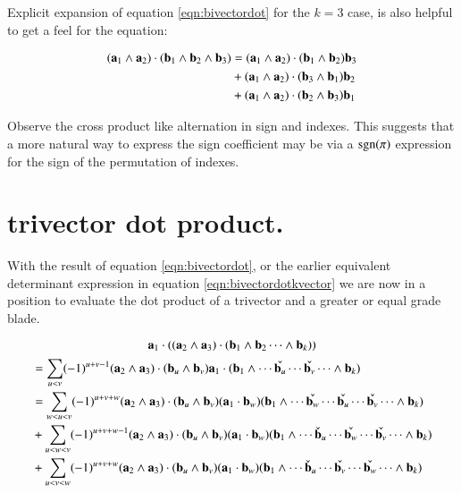 \documentclass{article}      %
\begin{document}
Explicit expansion of equation \ref{eqn:bivectordot} for the $k=3$ case, is also helpful to get a feel for
the equation:

\begin{align*}
(\mathbf{a}_{1} \wedge \mathbf{a}_2) \cdot (\mathbf{b}_1 \wedge \mathbf{b}_2 \wedge \mathbf{b}_3)
&= 
(\mathbf{a}_1 \wedge \mathbf{a}_2) \cdot (\mathbf{b}_1 \wedge \mathbf{b}_2) \mathbf{b}_3 \\
&+(\mathbf{a}_1 \wedge \mathbf{a}_2) \cdot (\mathbf{b}_3 \wedge \mathbf{b}_1) \mathbf{b}_2 \\
&+(\mathbf{a}_1 \wedge \mathbf{a}_2) \cdot (\mathbf{b}_2 \wedge \mathbf{b}_3) \mathbf{b}_1
\end{align*}

Observe the cross product like alternation in sign and indexes.
This suggests that a more natural way to express the sign coefficient may be via a $\operatorname{sgn}(\pi)$ expression for the sign of the
permutation of indexes.

\section{ trivector dot product. }

With the result of equation \ref{eqn:bivectordot}, or the earlier equivalent determinant expression in equation 
\ref{eqn:bivectordotkvector} we are now in a position to evaluate the dot product of a trivector and a greater or equal grade blade.

\begin{equation*}
\mathbf{a}_1 \cdot ((\mathbf{a}_{2} \wedge \mathbf{a}_3) \cdot (\mathbf{b}_1 \wedge \mathbf{b}_2 \cdots \wedge \mathbf{b}_k))
\end{equation*}
\begin{align*}
&= 
\sum_{u<v} (-1)^{u+v-1} 
(\mathbf{a}_2 \wedge \mathbf{a}_3) \cdot (\mathbf{b}_u \wedge \mathbf{b}_v)
\mathbf{a}_1 \cdot (\mathbf{b}_1 \wedge \cdots \check{\mathbf{b}_u} \cdots \check{\mathbf{b}_v} \cdots \wedge \mathbf{b}_k)  \\
&= 
\sum_{w<u<v} (-1)^{u+v+w} 
(\mathbf{a}_2 \wedge \mathbf{a}_3) \cdot (\mathbf{b}_u \wedge \mathbf{b}_v)
(\mathbf{a}_1 \cdot \mathbf{b}_w) (\mathbf{b}_1 \wedge \cdots \check{\mathbf{b}_w} \cdots \check{\mathbf{b}_u} \cdots \check{\mathbf{b}_v} \cdots \wedge \mathbf{b}_k)  \\
&+\sum_{u<w<v} (-1)^{u+v+w-1} 
(\mathbf{a}_2 \wedge \mathbf{a}_3) \cdot (\mathbf{b}_u \wedge \mathbf{b}_v)
(\mathbf{a}_1 \cdot \mathbf{b}_w) (\mathbf{b}_1 \wedge \cdots \check {\mathbf{b}}_u \cdots \check{\mathbf{b}_w} \cdots \check{\mathbf{b}_v} \cdots \wedge \mathbf{b}_k)  \\
&+\sum_{u<v<w} (-1)^{u+v+w} 
(\mathbf{a}_2 \wedge \mathbf{a}_3) \cdot (\mathbf{b}_u \wedge \mathbf{b}_v)
(\mathbf{a}_1 \cdot \mathbf{b}_w) (\mathbf{b}_1 \wedge \cdots \check {\mathbf{b}}_u \cdots \check{\mathbf{b}_v} \cdots \check{\mathbf{b}_w} \cdots \wedge \mathbf{b}_k)  \\
\end{align*}
\end{document}
